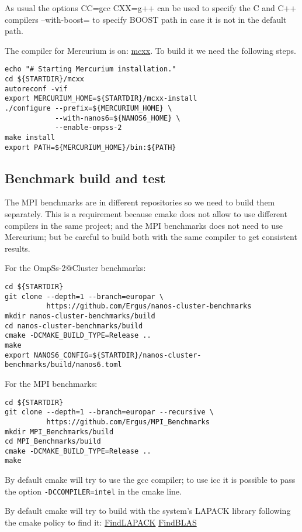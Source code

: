 \documentclass{article}
\newcommand{\code}[1]{\texttt{#1}}
\begin{document}
As usual the options CC=gcc CXX=g++ can be used to specify the C and
C++ compilers --with-boost= to specify BOOST path in case it is not in
the default path.

The compiler for Mercurium is on:
\href{https://github.com/bsc-pm/mcxx}{mcxx}. To build it we need the
following steps.

\begin{lstlisting}
echo "# Starting Mercurium installation."
cd ${STARTDIR}/mcxx
autoreconf -vif
export MERCURIUM_HOME=${STARTDIR}/mcxx-install
./configure --prefix=${MERCURIUM_HOME} \
            --with-nanos6=${NANOS6_HOME} \
            --enable-ompss-2
make install
export PATH=${MERCURIUM_HOME}/bin:${PATH}
\end{lstlisting}

\subsection{Benchmark build and test}

The MPI benchmarks are in different repositories so we need to build
them separately. This is a requirement because cmake does not allow to use
different compilers in the same project; and the MPI benchmarks does
not need to use Mercurium; but be careful to build both with the same
compiler to get consistent results.

For the OmpSs-2@Cluster benchmarks:

\begin{lstlisting}
cd ${STARTDIR}
git clone --depth=1 --branch=europar \
          https://github.com/Ergus/nanos-cluster-benchmarks
mkdir nanos-cluster-benchmarks/build
cd nanos-cluster-benchmarks/build
cmake -DCMAKE_BUILD_TYPE=Release ..
make
export NANOS6_CONFIG=${STARTDIR}/nanos-cluster-benchmarks/build/nanos6.toml
\end{lstlisting}

For the MPI benchmarks:

\begin{lstlisting}
cd ${STARTDIR}
git clone --depth=1 --branch=europar --recursive \
          https://github.com/Ergus/MPI_Benchmarks
mkdir MPI_Benchmarks/build
cd MPI_Benchmarks/build
cmake -DCMAKE_BUILD_TYPE=Release ..
make
\end{lstlisting}

By default cmake will try to use the gcc compiler; to use icc it is
possible to pass the option \code{-DCCOMPILER=intel} in the cmake
line.

By default cmake will try to build with the system's LAPACK library
following the cmake policy to find it:
\href{https://cmake.org/cmake/help/latest/module/FindLAPACK.html}{FindLAPACK}
\href{https://cmake.org/cmake/help/latest/module/FindBLAS.html}{FindBLAS}
\end{document}
